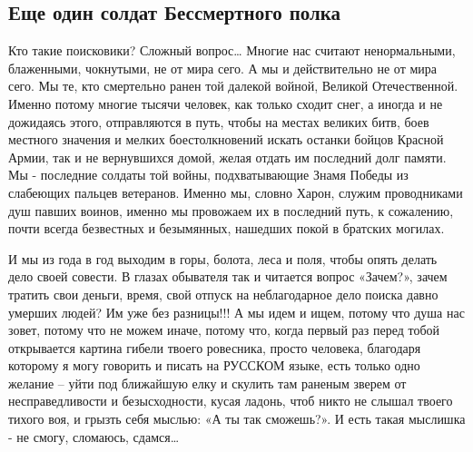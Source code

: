  
 
 

\subsection{Еще один солдат Бессмертного полка}


Кто такие поисковики? Сложный вопрос… Многие нас считают ненормальными,
блаженными, чокнутыми, не от мира сего. А мы и действительно не от мира сего.
Мы те, кто смертельно ранен той далекой войной, Великой Отечественной. Именно
потому многие тысячи человек, как только сходит снег, а иногда и не дожидаясь
этого, отправляются в путь, чтобы на местах великих битв, боев местного
значения и мелких боестолкновений искать останки бойцов Красной Армии, так и не
вернувшихся домой, желая отдать им последний долг памяти. Мы - последние
солдаты той войны, подхватывающие Знамя Победы из слабеющих пальцев ветеранов.
Именно мы, словно Харон, служим проводниками душ павших воинов, именно мы
провожаем их в последний путь, к сожалению, почти всегда безвестных и
безымянных, нашедших покой в братских могилах.

И мы из года в год выходим в горы, болота, леса и поля, чтобы опять делать дело
своей совести. В глазах обывателя так и читается вопрос «Зачем?», зачем тратить
свои деньги, время, свой отпуск на неблагодарное дело поиска давно умерших
людей? Им уже без разницы!!! А мы идем и ищем, потому что душа нас зовет,
потому что не можем иначе, потому что, когда первый раз перед тобой открывается
картина гибели твоего ровесника, просто человека, благодаря которому я могу
говорить и писать на РУССКОМ языке, есть только одно желание – уйти под
ближайшую елку и скулить там раненым зверем от несправедливости и
безысходности, кусая ладонь, чтоб никто не слышал твоего тихого воя, и грызть
себя мыслью: «А ты так сможешь?». И есть такая мыслишка - не смогу, сломаюсь,
сдамся…

